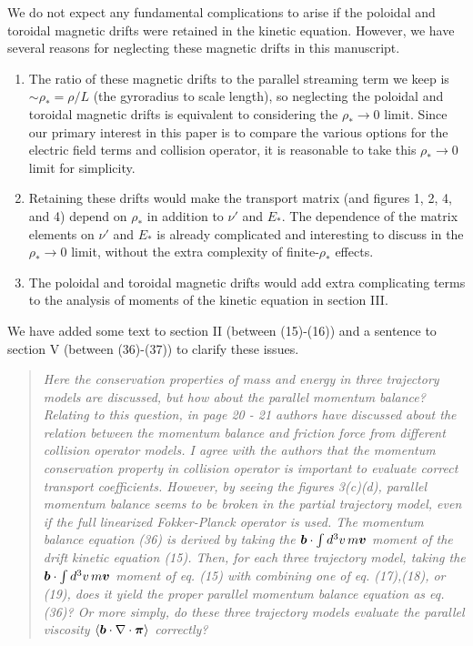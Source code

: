 \documentclass[11pt]{article}
\newcommand{\vect}[1]{\mbox{\boldmath $#1$}}
\newenvironment{referee}{\begin{quote}\it\color{Blue}}{\end{quote}}
\begin{document}
We do not expect any fundamental complications to arise if the poloidal and toroidal magnetic drifts
were retained in the kinetic equation. 
However, we have several reasons for neglecting these magnetic drifts
 in this manuscript.
\begin{enumerate}
\item The ratio of these magnetic drifts to the parallel streaming term we keep is $\sim \rho_* = \rho / L$
 (the gyroradius to scale length), so neglecting the poloidal and toroidal magnetic drifts is
equivalent to considering the $\rho_* \to 0$ limit.
Since our primary interest in this paper is to compare the various options for the electric field
terms and collision operator, it is reasonable to take this $\rho_* \to 0$ limit for simplicity.
\item
Retaining these drifts would make the transport matrix (and figures 1, 2, 4, and 4)
depend on $\rho_*$ in addition to $\nu'$ and $E_*$. 
The dependence of the matrix elements on $\nu'$ and $E_*$ is already  complicated
and interesting to discuss in the $\rho_* \to 0$ limit,
without the extra complexity of finite-$\rho_*$ effects.
\item The poloidal and toroidal magnetic drifts would add extra complicating
terms to the analysis of moments of the kinetic equation in section III.
\end{enumerate}

We have added some text to section II (between (15)-(16)) and a sentence to section V (between (36)-(37)) to clarify these issues.

\begin{referee}
Here the conservation properties of mass and energy in three trajectory models are discussed,
but how about the parallel momentum balance? Relating to this question, in page 20 - 21
authors have discussed about the relation between the momentum balance and friction force
from different collision operator models. I agree with the authors that the momentum
conservation property in collision operator is important to evaluate correct transport coefficients.
However, by seeing the figures 3(c)(d), parallel momentum balance seems to be broken in the
partial trajectory model, even if the full linearized Fokker-Planck operator is used.
The momentum balance equation (36) is derived by taking the $\vect{b}\cdot \int d^3v\, m\vect{v}$ moment of the drift
kinetic equation (15). Then, for each three trajectory model, taking the $\vect{b}\cdot \int d^3v\, m\vect{v}$ moment of
eq. (15) with combining one of eq. (17),(18), or (19), does it yield the proper parallel momentum
balance equation as eq.(36)? Or more simply, do these three trajectory models evaluate the
parallel viscosity $\left<\vect{b}\cdot\nabla\cdot\vect{\pi}\right>$ correctly?
\end{referee}
\end{document}
